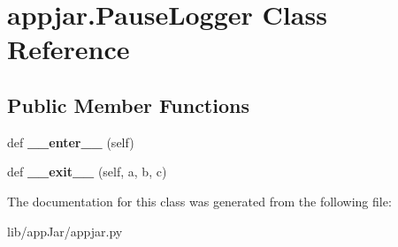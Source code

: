 \hypertarget{classappjar_1_1_pause_logger}{}\section{appjar.\+Pause\+Logger Class Reference}
\label{classappjar_1_1_pause_logger}
\subsection*{Public Member Functions}
\begin{DoxyCompactItemize}
\item 
\mbox{\label{classappjar_1_1_pause_logger_a71c5e7fb33dcd9978d0807f248c65c80}} 
def {\bfseries \+\_\+\+\_\+enter\+\_\+\+\_\+} (self)
\item 
\mbox{\label{classappjar_1_1_pause_logger_a9c3cb4f9429bf13c49406ed0024080f5}} 
def {\bfseries \+\_\+\+\_\+exit\+\_\+\+\_\+} (self, a, b, c)
\end{DoxyCompactItemize}


The documentation for this class was generated from the following file\+:\begin{DoxyCompactItemize}
\item 
lib/app\+Jar/appjar.\+py\end{DoxyCompactItemize}
